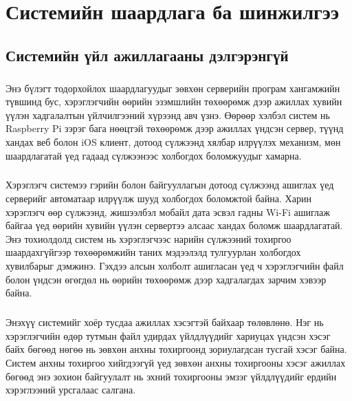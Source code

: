 
\chapter{Системийн шаардлага ба шинжилгээ} %
\label{Chapter2} %
\section{Системийн үйл ажиллагааны дэлгэрэнгүй}

\paragraph{}
Энэ бүлэгт тодорхойлох шаардлагуудыг зөвхөн серверийн програм хангамжийн түвшинд бус, хэрэглэгчийн өөрийн эзэмшлийн төхөөрөмж дээр ажиллах хувийн үүлэн хадгалалтын үйлчилгээний хүрээнд авч үзнэ. Өөрөөр хэлбэл систем нь Raspberry Pi зэрэг бага нөөцтэй төхөөрөмж дээр ажиллах үндсэн сервер, түүнд хандах веб болон iOS клиент, дотоод сүлжээнд хялбар илрүүлэх механизм, мөн шаардлагатай үед гадаад сүлжээнээс холбогдох боломжуудыг хамарна.

\paragraph{}
Хэрэглэгч системээ гэрийн болон байгууллагын дотоод сүлжээнд ашиглах үед серверийг автоматаар илрүүлж шууд холбогдох боломжтой байна. Харин хэрэглэгч өөр сүлжээнд, жишээлбэл мобайл дата эсвэл гадны Wi-Fi ашиглаж байгаа үед өөрийн хувийн үүлэн сервертээ алсаас хандах боломж шаардлагатай. Энэ тохиолдолд систем нь хэрэглэгчээс нарийн сүлжээний тохиргоо шаардахгүйгээр төхөөрөмжийн таних мэдээлэлд тулгуурлан холбогдох хувилбарыг дэмжинэ. Гэхдээ алсын холболт ашигласан үед ч хэрэглэгчийн файл болон үндсэн өгөгдөл нь өөрийн төхөөрөмж дээр хадгалагдах зарчим хэвээр байна.

\paragraph{}
Энэхүү системийг хоёр тусдаа ажиллах хэсэгтэй байхаар төлөвлөнө. Нэг нь хэрэглэгчийн өдөр тутмын файл удирдах үйлдлүүдийг хариуцах үндсэн хэсэг байх бөгөөд нөгөө нь зөвхөн анхны тохиргоонд зориулагдсан тусгай хэсэг байна. Систем анхны тохиргоо хийгдээгүй үед зөвхөн анхны тохиргооны хэсэг ажиллах бөгөөд энэ зохион байгуулалт нь эхний тохиргооны эмзэг үйлдлүүдийг ердийн хэрэглээний урсгалаас салгана.

